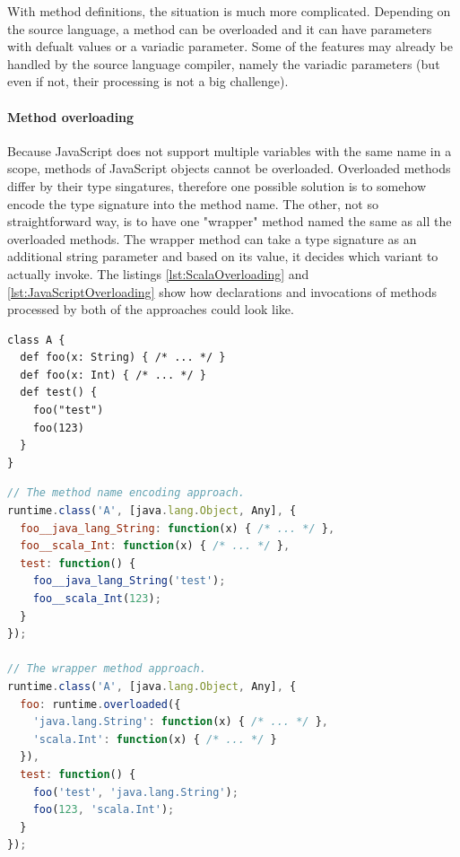 \documentclass[12pt,a4paper]{report}
\begin{document}
With method definitions, the situation is much more complicated. Depending on the source language, a method can be overloaded and it can have parameters with defualt values or a variadic parameter. Some of the features may already be handled by the source language compiler, namely the variadic parameters (but even if not, their processing is not a big challenge).

\paragraph{Method overloading} Because JavaScript does not support multiple variables with the same name in a scope, methods of JavaScript objects cannot be overloaded. Overloaded methods differ by their type singatures, therefore one possible solution is to somehow encode the type signature into the method name. The other, not so straightforward way, is to have one "wrapper" method named the same as all the overloaded methods. The wrapper method can take a type signature as an additional string parameter and based on its value, it decides which variant to actually invoke. The listings \ref{lst:ScalaOverloading} and \ref{lst:JavaScriptOverloading} show how declarations and invocations of methods processed by both of the approaches could look like.

\begin{lstlisting}[frame=single,caption={Scala overloading example.},label={lst:ScalaOverloading}]
class A {
  def foo(x: String) { /* ... */ }
  def foo(x: Int) { /* ... */ }
  def test() {
    foo("test")
    foo(123)
  }
}
\end{lstlisting}

\begin{lstlisting}[language=JavaScript,frame=single,caption={Overloading in JavaScript.},label={lst:JavaScriptOverloading}]
// The method name encoding approach.
runtime.class('A', [java.lang.Object, Any], {
  foo__java_lang_String: function(x) { /* ... */ },
  foo__scala_Int: function(x) { /* ... */ },
  test: function() {
    foo__java_lang_String('test');
    foo__scala_Int(123);
  }
});

// The wrapper method approach.
runtime.class('A', [java.lang.Object, Any], {
  foo: runtime.overloaded({
    'java.lang.String': function(x) { /* ... */ },
    'scala.Int': function(x) { /* ... */ }
  }),
  test: function() {
    foo('test', 'java.lang.String');
    foo(123, 'scala.Int');
  }
});
\end{lstlisting}
\end{document}
